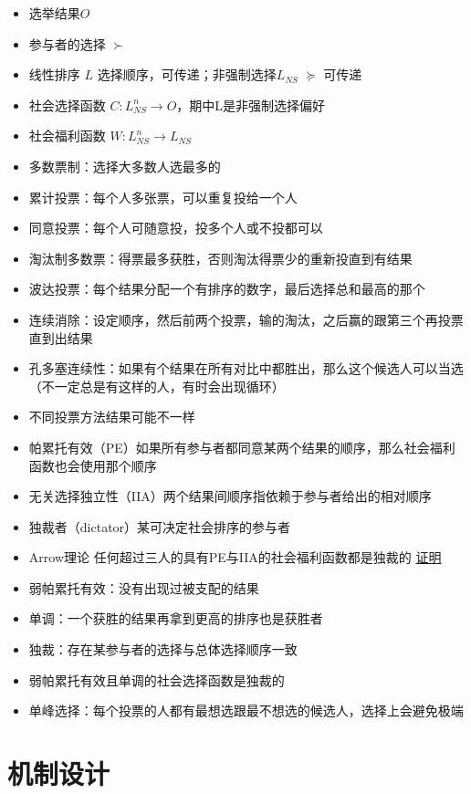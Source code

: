 \documentclass[
]{book}
\providecommand{\tightlist}{%
  \setlength{\itemsep}{0pt}\setlength{\parskip}{0pt}}
\begin{document}
\begin{itemize}
\tightlist
\item
  选举结果\(O\)
\item
  参与者的选择 \(\succ\)
\item
  线性排序 \(L\) 选择顺序，可传递；非强制选择\(L_{NS}\) \(\succeq\) 可传递
\item
  社会选择函数 \(C:L_{NS}^n \rightarrow O\)，期中L是非强制选择偏好
\item
  社会福利函数 \(W:L_{NS}^n \rightarrow L_{NS}\)
\item
  多数票制：选择大多数人选最多的
\item
  累计投票：每个人多张票，可以重复投给一个人
\item
  同意投票：每个人可随意投，投多个人或不投都可以
\item
  淘汰制多数票：得票最多获胜，否则淘汰得票少的重新投直到有结果
\item
  波达投票：每个结果分配一个有排序的数字，最后选择总和最高的那个
\item
  连续消除：设定顺序，然后前两个投票，输的淘汰，之后赢的跟第三个再投票直到出结果
\item
  孔多塞连续性：如果有个结果在所有对比中都胜出，那么这个候选人可以当选（不一定总是有这样的人，有时会出现循环）
\item
  不同投票方法结果可能不一样
\item
  帕累托有效（PE）如果所有参与者都同意某两个结果的顺序，那么社会福利函数也会使用那个顺序
\item
  无关选择独立性（IIA）两个结果间顺序指依赖于参与者给出的相对顺序
\item
  独裁者（dictator）某可决定社会排序的参与者
\item
  Arrow理论 任何超过三人的具有PE与IIA的社会福利函数都是独裁的 \href{https://www.douban.com/group/topic/46208753/}{证明}
\item
  弱帕累托有效：没有出现过被支配的结果
\item
  单调：一个获胜的结果再拿到更高的排序也是获胜者
\item
  独裁：存在某参与者的选择与总体选择顺序一致
\item
  弱帕累托有效且单调的社会选择函数是独裁的
\item
  单峰选择：每个投票的人都有最想选跟最不想选的候选人，选择上会避免极端
\end{itemize}

\hypertarget{ux673aux5236ux8bbeux8ba1}{%
\section{机制设计}\label{ux673aux5236ux8bbeux8ba1}}
\end{document}
